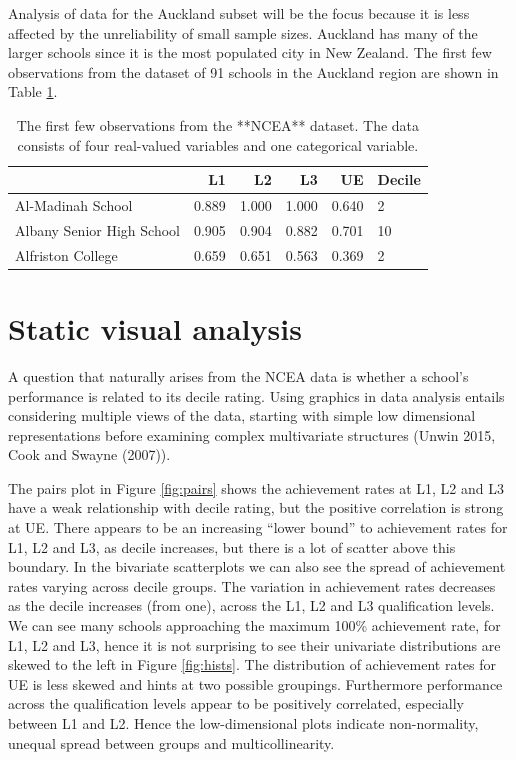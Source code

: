 \documentclass[]{book}
\theoremstyle{definition}
\theoremstyle{definition}
\theoremstyle{definition}
\theoremstyle{remark}
\begin{document}
Analysis of data for the Auckland subset will be the focus because it is
less affected by the unreliability of small sample sizes. Auckland has
many of the larger schools since it is the most populated city in New
Zealand. The first few observations from the dataset of 91 schools in
the Auckland region are shown in Table \ref{tab:akl}.

\begin{table}

\caption{\label{tab:akl}The first few observations from the **NCEA** dataset. The data consists of four real-valued variables and one categorical variable.}
\centering
\begin{tabular}[t]{lrrrrl}
\toprule
  & L1 & L2 & L3 & UE & Decile\\
\midrule
Al-Madinah School & 0.889 & 1.000 & 1.000 & 0.640 & 2\\
Albany Senior High School & 0.905 & 0.904 & 0.882 & 0.701 & 10\\
Alfriston College & 0.659 & 0.651 & 0.563 & 0.369 & 2\\
\bottomrule
\end{tabular}
\end{table}

\section{Static visual analysis}\label{static-visual-analysis}

A question that naturally arises from the NCEA data is whether a
school's performance is related to its decile rating. Using graphics in
data analysis entails considering multiple views of the data, starting
with simple low dimensional representations before examining complex
multivariate structures (Unwin 2015, Cook and Swayne (2007)).

The pairs plot in Figure \ref{fig:pairs} shows the achievement rates at
L1, L2 and L3 have a weak relationship with decile rating, but the
positive correlation is strong at UE. There appears to be an increasing
``lower bound'' to achievement rates for L1, L2 and L3, as decile
increases, but there is a lot of scatter above this boundary. In the
bivariate scatterplots we can also see the spread of achievement rates
varying across decile groups. The variation in achievement rates
decreases as the decile increases (from one), across the L1, L2 and L3
qualification levels. We can see many schools approaching the maximum
100\% achievement rate, for L1, L2 and L3, hence it is not surprising to
see their univariate distributions are skewed to the left in Figure
\ref{fig:hists}. The distribution of achievement rates for UE is less
skewed and hints at two possible groupings. Furthermore performance
across the qualification levels appear to be positively correlated,
especially between L1 and L2. Hence the low-dimensional plots indicate
non-normality, unequal spread between groups and multicollinearity.
\end{document}
